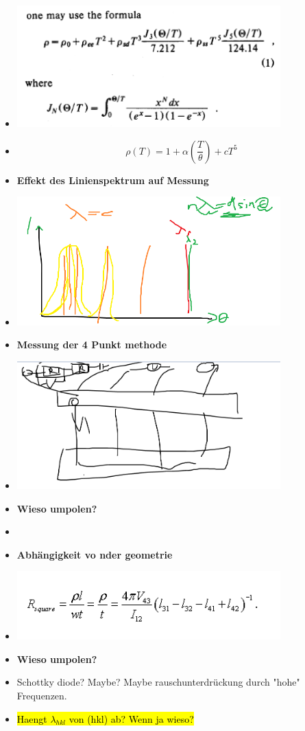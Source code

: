 \begin{itemize}
    \item \includegraphics[width=0.8\textwidth]{copperwut.PNG}
    \item $$\rho(T) = 1 + \alpha(\frac{T}{\theta}) + cT^5$$
    \item \textbf{Effekt des Linienspektrum auf Messung}
    \item \includegraphics[width=0.8\textwidth]{linienspeckie.PNG}
    \item \textbf{Messung der 4 Punkt methode}
    \item \includegraphics[width=0.8\textwidth]{4pointstyle.PNG}
    \item \textbf{Wieso umpolen?}
    \item %
    \item \textbf{Abhängigkeit vo nder geometrie}
    \item \includegraphics[width=0.8\textwidth]{geom.PNG}
    \item \textbf{Wieso umpolen?}
    \item Schottky diode? Maybe? Maybe rauschunterdrückung durch "hohe" Frequenzen.
\end{itemize}

\begin{itemize}
    \item \hl{Haengt $\lambda_{hkl}$ von (hkl) ab? Wenn ja wieso?}
\end{itemize}